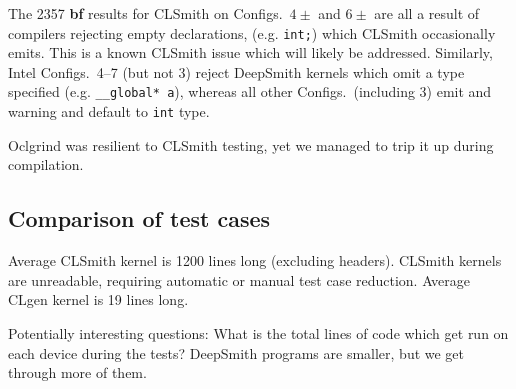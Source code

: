 
The 2357 \textbf{bf} results for CLSmith on Configs.\ $4\pm$ and $6\pm$ are all a result of compilers rejecting empty declarations, (e.g. \texttt{int;}) which CLSmith occasionally emits. This is a known CLSmith issue which will likely be addressed.
Similarly, Intel Configs.\ 4--7 (but not 3) reject DeepSmith kernels which omit a type specified (e.g. \texttt{\_\_global* a}), whereas all other Configs.\ (including 3) emit and warning and default to \texttt{int} type.


Oclgrind was resilient to CLSmith testing, yet we managed to trip it up during compilation.


\subsection{Comparison of test cases}

Average CLSmith kernel is 1200 lines long (excluding headers). CLSmith kernels are unreadable, requiring automatic or manual test case reduction. Average CLgen kernel is 19 lines long.


Potentially interesting questions: What is the total lines of code which get run on each device during the tests? DeepSmith programs are smaller, but we get through more of them.

